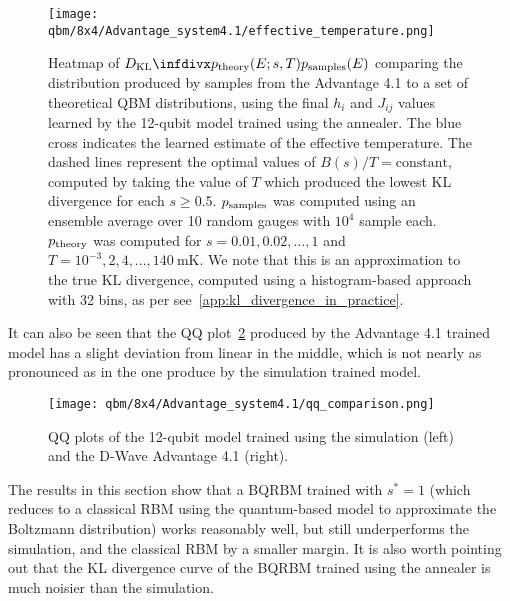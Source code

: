 \begin{figure}[!htb]
    \begin{center}
        \texttt{[image: qbm/8x4/Advantage\_system4.1/effective\_temperature.png]}
    \end{center}
    \caption{
        Heatmap of \( \DKL{\ptheory(E;s,T)}{\psamples(E)} \) comparing the distribution produced by samples from the Advantage 4.1 to a set of theoretical QBM distributions, using the final \( h_i \) and \( J_{ij} \) values learned by the 12-qubit model trained using the annealer.
        The blue cross indicates the learned estimate of the effective temperature.
        The dashed lines represent the optimal values of \( B(s) / T = \text{constant} \), computed by taking the value of \( T \) which produced the lowest KL divergence for each \( s \ge 0.5 \).
        \( p_{\text{samples}} \) was computed using an ensemble average over 10 random gauges with \( 10^4 \) sample each.
        \( p_{\text{theory}} \) was computed for \( s = 0.01, 0.02, \dots, 1 \) and \( T = 10^{-3}, 2, 4, \dots, 140 \ \si{\milli\kelvin} \).
        We note that this is an approximation to the true KL divergence, computed using a histogram-based approach with 32 bins, as per see~\cref{app:kl_divergence_in_practice}.
    }
    \label{fig:learned_effective_temperature}
\end{figure}

It can also be seen that the QQ plot~\cref{fig:qq_comparison} produced by the Advantage 4.1 trained model has a slight deviation from linear in the middle, which is not nearly as pronounced as in the one produce by the simulation trained model.
\begin{figure}[!htb]
    \begin{center}
        \texttt{[image: qbm/8x4/Advantage\_system4.1/qq\_comparison.png]}
    \end{center}
    \caption{QQ plots of the 12-qubit model trained using the simulation (left) and the D-Wave Advantage 4.1 (right).}
    \label{fig:qq_comparison}
\end{figure}

The results in this section show that a BQRBM trained with \( s^* = 1 \) (which reduces to a classical RBM using the quantum-based model to approximate the Boltzmann distribution) works reasonably well, but still underperforms the simulation, and the classical RBM by a smaller margin.
It is also worth pointing out that the KL divergence curve of the BQRBM trained using the annealer is much noisier than the simulation.


